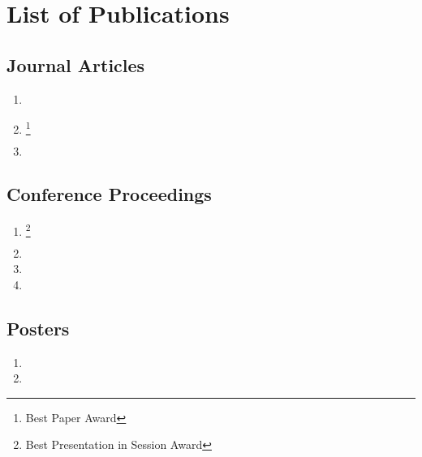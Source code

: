 \chapter*{List of Publications}

\section*{Journal Articles}
\begin{enumerate}
	\item {}
	\item {}\footnote{\label{award:paper}Best Paper Award}
	\item {}
\end{enumerate}

\section*{Conference Proceedings}
\begin{enumerate}
	\item {}\footnote{\label{award:presentation}Best Presentation in Session Award}
	\item {}
	\item {}
	\item {}
\end{enumerate}

\section*{Posters}
\begin{enumerate}
	\item {}
	\item {}
\end{enumerate}